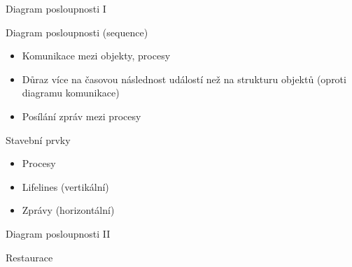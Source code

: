 \begin{frame}{Diagram posloupnosti I}

Diagram posloupnosti (sequence)

\begin{itemize}[<+->]
    \item Komunikace mezi objekty, procesy
    \item Důraz více na časovou následnost událostí než 
          na strukturu objektů (oproti diagramu komunikace)
    \item Posílání zpráv mezi procesy
\end{itemize}

\onslide<+->Stavební prvky
\begin{itemize}[<+->]
    \item Procesy
    \item Lifelines (vertikální)
    \item Zprávy (horizontální)
\end{itemize}

\end{frame}



\begin{frame}{Diagram posloupnosti II}

Restaurace

\begin{figure}
\end{figure}

\end{frame}

